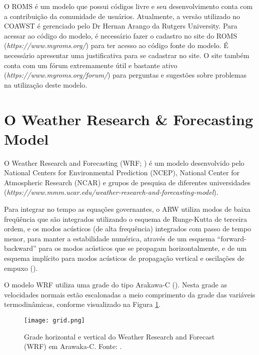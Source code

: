 \noindent O ROMS é um modelo que possui códigos livre e seu desenvolvimento conta com a contribuição da comunidade de usuários. Atualmente, a versão utilizado no COAWST é gerenciado pelo Dr Hernan Arango da Rutgers University. Para acessar ao código do modelo, é necessário fazer o cadastro no site do ROMS (\textcolor{bleu_cite}{\textit{https://www.myroms.org/}}) para ter acesso ao código fonte do modelo. É necessário apresentar uma justificativa para se cadastrar no site. O site também conta com um fórum extremamente útil e bastante ativo (\textcolor{bleu_cite}{\textit{https://www.myroms.org/forum/}}) para perguntas e sugestões sobre problemas na utilização deste modelo.
\bigskip


\section{O Weather Research \& Forecasting Model}
\bigskip

\noindent O Weather Research and Forecasting (WRF; \cite{Skamarock2008}) é um modelo desenvolvido pelo National Centers for Environmental Prediction (NCEP), National Center for Atmospheric Research (NCAR) e grupos de pesquisa de diferentes universidades (\textcolor{bleu_cite}{\textit{https://www.mmm.ucar.edu/weather-research-and-forecasting-model}}).
\bigskip

\noindent Para integrar no tempo as equações governantes, o ARW utiliza modos de baixa freqüência que são integrados utilizando o esquema de Runge-Kutta de terceira ordem, e os modos acústicos (de alta frequência) integrados com passo de tempo menor, para manter a estabilidade numérica, através de um esquema “forward-backward” para os modos acústicos que se propagam horizontalmente, e de um esquema implícito para modos acústicos de propagação vertical e oscilações de empuxo (\cite{Skamarock2008}).
\bigskip

\noindent O modelo WRF utiliza uma grade do tipo Arakawa-C (\cite{Arakawa1977}). Nesta grade as velocidades normais estão escalonadas a meio comprimento da grade das variáveis termodinâmicas, conforme visualizado na Figura \textcolor{bleu_cite}{\ref{gradeswrf}}.
\bigskip


\begin{figure}[H]
    \centering
    \captionsetup{justification=centering}
    \texttt{[image: grid.png]}
    \centering \caption{Grade horizontal e vertical do Weather Research and Forecast (WRF) em Arawaka-C. \newline Fonte: \textcite{Skamarock2008}.}
    \label{gradeswrf}
\end{figure}
\bigskip

